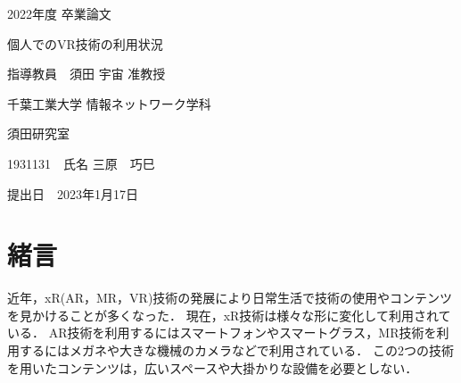 \documentclass[12pt,a4j]{ltjsarticle}
\begin{document}
 

\begin{titlepage}
 \begin{center}
  
    \vspace*{20truept}
    
    {\LARGE 2022年度 卒業論文} 
    
    \vspace*{75truept}
    
    {\LARGE 個人でのVR技術の利用状況}
    
    
    \vspace{85truept}
    
    {\LARGE 指導教員　須田 宇宙 准教授}
    
    \vspace{60truept}
    
    {\LARGE 千葉工業大学 情報ネットワーク学科}
    
    \vspace{15truept}
    
    {\LARGE 須田研究室}
    
    \vspace{70truept}
    
    {\LARGE 1931131　氏名 三原　巧巳 }　%

    \vspace{70truept}
    
  \end{center}
  \begin{flushright}

    {\LARGE 提出日　2023年1月17日}
  
  \end{flushright}
\end{titlepage}
\clearpage

\setcounter{tocdepth}{3}
\tableofcontents
\listoffigures
\clearpage
{}
\setcounter{page}{1}



\section{緒言}
近年，xR(AR，MR，VR)技術の発展により日常生活で技術の使用やコンテンツを見かけることが多くなった．
現在，xR技術は様々な形に変化して利用されている．
AR技術を利用するにはスマートフォンやスマートグラス，MR技術を利用するにはメガネや大きな機械のカメラなどで利用されている．
この2つの技術を用いたコンテンツは，広いスペースや大掛かりな設備を必要としない．
\end{document}
